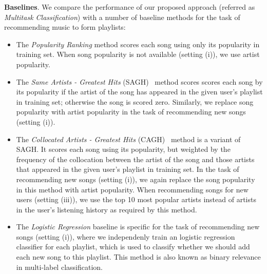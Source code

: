 {\bf Baselines}.
We compare the performance of our proposed approach (referred as {\it Multitask Classification}) 
with a number of baseline methods for the task of recommending music to form playlists:
\begin{itemize}
\item The {\it Popularity Ranking} method scores each song using only its popularity in training set.
      When song popularity is not available (setting (i)), we use artist popularity.
\item The {\it Same Artists - Greatest Hits} (SAGH)~\cite{mcfee2012million} method scores scores each song
      by its popularity if the artist of the song has appeared in the given user's playlist in training set;
      otherwise the song is scored zero.
      Similarly, we replace song popularity with artist popularity in the task of recommending new songs (setting (i)).
\item The {\it Collocated Artists - Greatest Hits} (CAGH)~\cite{bonnin2013evaluating} method is a variant of SAGH.
      It scores each song using its popularity, but weighted by the frequency of the collocation between the artist of the song
      and those artists that appeared in the given user's playlist in training set.
      In the task of recommending new songs (setting (i)), we again replace the song popularity in this method with artist popularity.
      When recommending songs for new users (setting (iii)), we use the top 10 most popular artists instead of artists in the user's
      listening history as required by this method.
\item The {\it Logistic Regression} baseline is specific for the task of recommending new songs (setting (i)), where we independenly train
      an logistic regression classifier for each playlist, which is used to classify whether we should add each new song to this playlist.
      This method is also known as binary relevance in multi-label classification.
\end{itemize}


